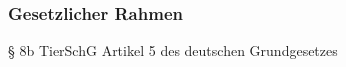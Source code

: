 \begin{frame}
\frametitle{Gesetzlicher Rahmen}
§ 8b TierSchG
Artikel 5 des deutschen Grundgesetzes
\end{frame}
